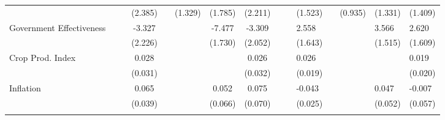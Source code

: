 \begin{table}[H]
\begin{adjustbox}{max width=\textwidth}
\begin{tabular}{l*{7}{c}}
            &                     &                     &     (2.385)         &                     &     (1.329)         &     (1.785)         &     (2.211)         &                     &                     &     (1.523)         &                     &     (0.935)         &     (1.331)         &     (1.409)         \\
\addlinespace
Government Effectiveness&                     &                     &      -3.327         &                     &                     &      -7.477\sym{***}&      -3.309         &                     &                     &       2.558         &                     &                     &       3.566\sym{**} &       2.620         \\
            &                     &                     &     (2.226)         &                     &                     &     (1.730)         &     (2.052)         &                     &                     &     (1.643)         &                     &                     &     (1.515)         &     (1.609)         \\
\addlinespace
Crop Prod. Index&                     &                     &       0.028         &                     &                     &                     &       0.026         &                     &                     &       0.026         &                     &                     &                     &       0.019         \\
            &                     &                     &     (0.031)         &                     &                     &                     &     (0.032)         &                     &                     &     (0.019)         &                     &                     &                     &     (0.020)         \\
\addlinespace
Inflation   &                     &                     &       0.065\sym{*}  &                     &                     &       0.052         &       0.075         &                     &                     &      -0.043\sym{*}  &                     &                     &       0.047         &      -0.007         \\
            &                     &                     &     (0.039)         &                     &                     &     (0.066)         &     (0.070)         &                     &                     &     (0.025)         &                     &                     &     (0.052)         &     (0.057)         \\
\addlinespace

\end{tabular}
\end{adjustbox}
\end{table}
